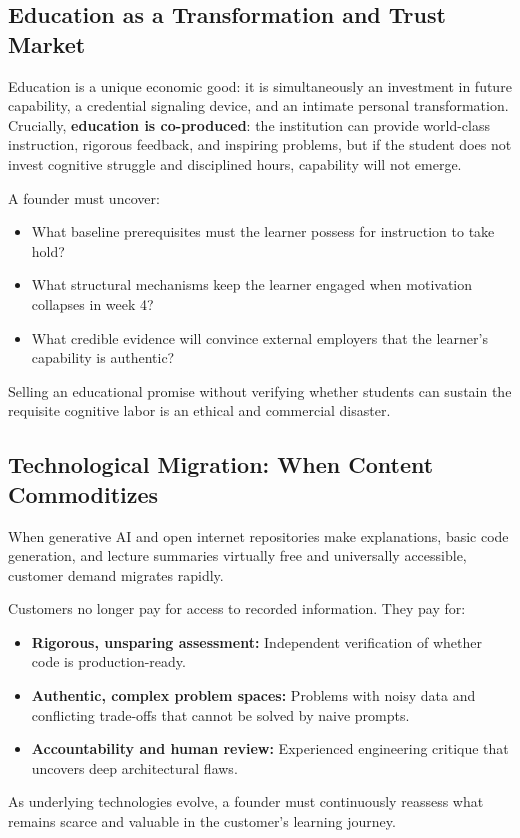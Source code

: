 \subsection{Education as a Transformation and Trust Market}

Education is a unique economic good: it is simultaneously an investment in future capability, a credential signaling device, and an intimate personal transformation. Crucially, \textbf{education is co-produced}: the institution can provide world-class instruction, rigorous feedback, and inspiring problems, but if the student does not invest cognitive struggle and disciplined hours, capability will not emerge.

A founder must uncover:
\begin{itemize}[leftmargin=1.2em,itemsep=0.2ex]
  \item What baseline prerequisites must the learner possess for instruction to take hold?
  \item What structural mechanisms keep the learner engaged when motivation collapses in week 4?
  \item What credible evidence will convince external employers that the learner's capability is authentic?
\end{itemize}
Selling an educational promise without verifying whether students can sustain the requisite cognitive labor is an ethical and commercial disaster.

\subsection{Technological Migration: When Content Commoditizes}

When generative AI and open internet repositories make explanations, basic code generation, and lecture summaries virtually free and universally accessible, customer demand migrates rapidly.

Customers no longer pay for access to recorded information. They pay for:
\begin{itemize}[leftmargin=1.2em,itemsep=0.2ex]
  \item \textbf{Rigorous, unsparing assessment:} Independent verification of whether code is production-ready.
  \item \textbf{Authentic, complex problem spaces:} Problems with noisy data and conflicting trade-offs that cannot be solved by naive prompts.
  \item \textbf{Accountability and human review:} Experienced engineering critique that uncovers deep architectural flaws.
\end{itemize}
As underlying technologies evolve, a founder must continuously reassess what remains scarce and valuable in the customer's learning journey.
